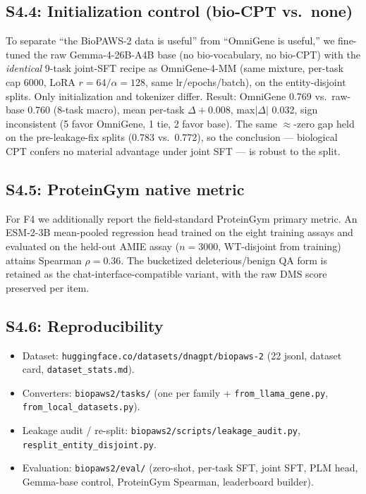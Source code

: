 \documentclass[11pt]{article}
\begin{document}
\subsection*{S4.4: Initialization control (bio-CPT vs.\ none)}
To separate ``the BioPAWS-2 data is useful'' from ``OmniGene is useful,'' we fine-tuned the
raw Gemma-4-26B-A4B base (no bio-vocabulary, no bio-CPT) with the \emph{identical} 9-task
joint-SFT recipe as OmniGene-4-MM (same mixture, per-task cap 6000, LoRA $r{=}64/\alpha{=}128$,
same lr/epochs/batch), on the entity-disjoint splits. Only initialization and tokenizer
differ. Result: OmniGene 0.769 vs.\ raw-base 0.760 (8-task macro), mean per-task
$\Delta{+}0.008$, max$|\Delta|$ 0.032, sign inconsistent (5 favor OmniGene, 1 tie, 2 favor
base). The same $\approx$-zero gap held on the pre-leakage-fix splits (0.783 vs.\ 0.772),
so the conclusion --- biological CPT confers no material advantage under joint SFT --- is
robust to the split.

\subsection*{S4.5: ProteinGym native metric}
For F4 we additionally report the field-standard ProteinGym primary metric. An ESM-2-3B
mean-pooled regression head trained on the eight training assays and evaluated on the
held-out AMIE assay ($n{=}3000$, WT-disjoint from training) attains Spearman $\rho = 0.36$.
The bucketized deleterious/benign QA form is retained as the chat-interface-compatible
variant, with the raw DMS score preserved per item.

\subsection*{S4.6: Reproducibility}
\begin{itemize}
  \item Dataset: \texttt{huggingface.co/datasets/dnagpt/biopaws-2} (22 jsonl, dataset card,
        \texttt{dataset\_stats.md}).
  \item Converters: \texttt{biopaws2/tasks/} (one per family + \texttt{from\_llama\_gene.py},
        \texttt{from\_local\_datasets.py}).
  \item Leakage audit / re-split: \texttt{biopaws2/scripts/leakage\_audit.py},
        \texttt{resplit\_entity\_disjoint.py}.
  \item Evaluation: \texttt{biopaws2/eval/} (zero-shot, per-task SFT, joint SFT, PLM head,
        Gemma-base control, ProteinGym Spearman, leaderboard builder).
\end{itemize}
\end{document}
